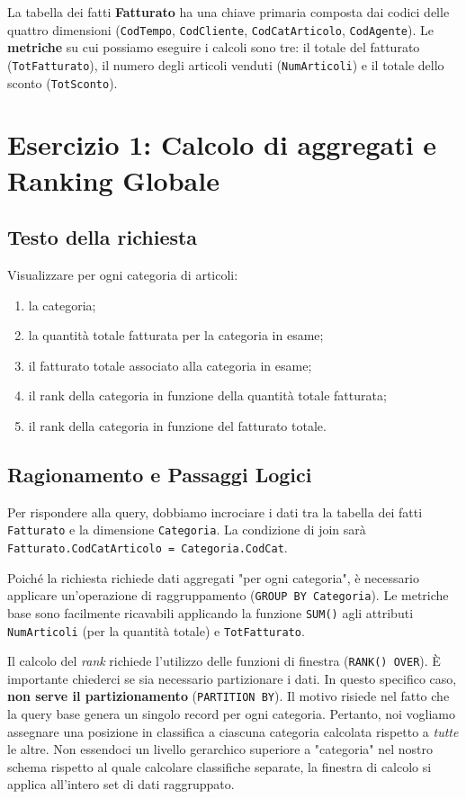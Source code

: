 La tabella dei fatti \textbf{Fatturato} ha una chiave primaria composta dai codici delle quattro dimensioni (\texttt{CodTempo}, \texttt{CodCliente}, \texttt{CodCatArticolo}, \texttt{CodAgente}). Le \textbf{metriche} su cui possiamo eseguire i calcoli sono tre: il totale del fatturato (\texttt{TotFatturato}), il numero degli articoli venduti (\texttt{NumArticoli}) e il totale dello sconto (\texttt{TotSconto}).

\section{Esercizio 1: Calcolo di aggregati e Ranking Globale}

\subsection{Testo della richiesta}
Visualizzare per ogni categoria di articoli:
\begin{enumerate}
    \item la categoria;
    \item la quantità totale fatturata per la categoria in esame;
    \item il fatturato totale associato alla categoria in esame;
    \item il rank della categoria in funzione della quantità totale fatturata;
    \item il rank della categoria in funzione del fatturato totale.
\end{enumerate}

\subsection{Ragionamento e Passaggi Logici}
Per rispondere alla query, dobbiamo incrociare i dati tra la tabella dei fatti \texttt{Fatturato} e la dimensione \texttt{Categoria}. La condizione di join sarà \texttt{Fatturato.CodCatArticolo = Categoria.CodCat}.

Poiché la richiesta richiede dati aggregati "per ogni categoria", è necessario applicare un'operazione di raggruppamento (\texttt{GROUP BY Categoria}). Le metriche base sono facilmente ricavabili applicando la funzione \texttt{SUM()} agli attributi \texttt{NumArticoli} (per la quantità totale) e \texttt{TotFatturato}.

Il calcolo del \textit{rank} richiede l'utilizzo delle funzioni di finestra (\texttt{RANK() OVER}). 
È importante chiederci se sia necessario partizionare i dati. In questo specifico caso, \textbf{non serve il partizionamento} (\texttt{PARTITION BY}). Il motivo risiede nel fatto che la query base genera un singolo record per ogni categoria. Pertanto, noi vogliamo assegnare una posizione in classifica a ciascuna categoria calcolata rispetto a \textit{tutte} le altre. Non essendoci un livello gerarchico superiore a "categoria" nel nostro schema rispetto al quale calcolare classifiche separate, la finestra di calcolo si applica all'intero set di dati raggruppato.

